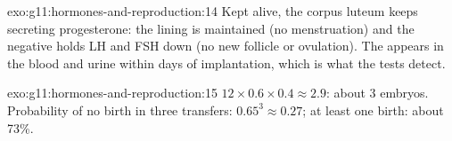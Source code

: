 \begin{solution}{exo:g11:hormones-and-reproduction:14}
Kept alive, the corpus luteum keeps secreting progesterone: the lining
is maintained (no menstruation) and the negative  holds LH
and FSH down (no new follicle or ovulation). The  appears in
the blood and urine within days of implantation, which is what the
tests detect.
\end{solution}

\begin{solution}{exo:g11:hormones-and-reproduction:15}
$12 \times 0.6 \times 0.4 \approx 2.9$: about 3 embryos. Probability
of no birth in three transfers: $0.65^3 \approx 0.27$; at least one
birth: about 73\%.
\end{solution}

